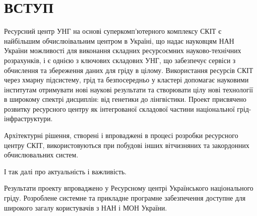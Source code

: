 \chapter{ВСТУП}

Ресурсний центр УНГ на основі суперкомп’ютерного комплексу СКІТ є найбільшим обчислюівальним центром в Україні, що надає науковцям НАН України можливості для виконання складних ресурсоємних науково-технічних розрахунків, і є однією з ключових складових УНГ, що забезпечує сервіси з обчислення та збереження даних для гріду в цілому.   Використання ресурсів СКІТ через хмарну підсистему, грід та безпосередньо у кластері допомагає науковими інститутам отримувати нові наукові результати та створювати цілу нові технології в широкому спектрі дисциплін: від генетики до лінгвістики. Проект присвячено розвитку ресурсного центру як інтегрованої складової частини національної грід-інфраструктури.

Архітектурні рішення, створені і впроваджені в процесі розробки ресурсного центру СКІТ, використовуються при побудові інших вітчизняних та закордонних обчислювальних систем.

І так далі про актуальність і важливість.

Результати проекту впроваджено у Ресурсному центрі Українського національного гріду. Розроблене системне та прикладне програмне забезпечення доступне для широкого загалу користувачів з НАН і МОН України. 
